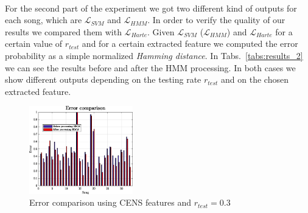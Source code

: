 \begin{table}[b]
	\centering
	\\
	\vspace{-3mm}
	\caption{Error results of the first part of the tests (full song chord recognition)}
	\label{tabs:results_2}
	\vspace{-6mm}
\end{table}
%
For the second part of the experiment we got two different kind of outputs for each song, which are $\mathcal{L}_{SVM}$ and $\mathcal{L}_{HMM}$. In order to verify the quality of our results we compared them with  $\mathcal{L}_{Harte}$. Given $\mathcal{L}_{SVM}$ ($\mathcal{L}_{HMM}$) and $\mathcal{L}_{Harte}$ for a certain value of $r_{test}$ and for a certain extracted feature we computed the error probability as a simple normalized \textit{Hamming distance}. In Tabs.~\ref{tabs:results_2} we can see the results before and after the HMM processing. In both cases we show different outputs depending on the testing rate $r_{test}$ and on the chosen extracted feature. \\
%
\begin{figure}[t]
	\centering
	\includegraphics[width=0.4\textwidth]{img/Result_HMM/CENS/plot03071}
	\vspace{-3mm}
	\caption{Error comparison using CENS features and $r_{test}=0.3$}
	\label{fig:compareerror}
	\vspace{-6mm}
\end{figure}
